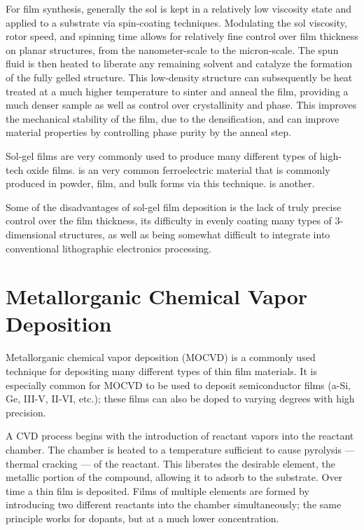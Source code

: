 For film synthesis, generally the sol is kept in a relatively low viscosity state and applied to a substrate via spin-coating techniques. Modulating the sol viscosity, rotor speed, and spinning time allows for relatively fine control over film thickness on planar structures, from the nanometer-scale to the micron-scale. The spun fluid is then heated to liberate any remaining solvent and catalyze the formation of the fully gelled structure. This low-density structure can subsequently be heat treated at a much higher temperature to sinter and anneal the film, providing a much denser sample as well as control over crystallinity and phase. This improves the mechanical stability of the film, due to the densification, and can improve material properties by controlling phase purity by the anneal step. 

Sol-gel films are very commonly used to produce many different types of high-tech oxide films.  is an very common ferroelectric material that is commonly produced in powder, film, and bulk forms via this technique.  is another. 

Some of the disadvantages of sol-gel film deposition is the lack of truly precise control over the film thickness, its difficulty in evenly coating many types of 3-dimensional structures, as well as being somewhat difficult to integrate into conventional lithographic electronics processing. 


\section{Metallorganic Chemical Vapor Deposition}
\label{sec:Synth-MOCVD}

Metallorganic chemical vapor deposition (MOCVD) is a commonly used technique for depositing many different types of thin film materials. It is especially common for MOCVD to be used to deposit semiconductor films (a-Si, Ge, III-V, II-VI, etc.); these films can also be doped to varying degrees with high precision. 

A CVD process begins with the introduction of reactant vapors into the reactant chamber. The chamber is heated to a temperature sufficient to cause pyrolysis --- thermal cracking --- of the reactant. This liberates the desirable element, the metallic portion of the compound, allowing it to adsorb to the substrate. Over time a thin film is deposited. Films of multiple elements are formed by introducing two different reactants into the chamber simultaneously; the same principle works for dopants, but at a much lower concentration. 

